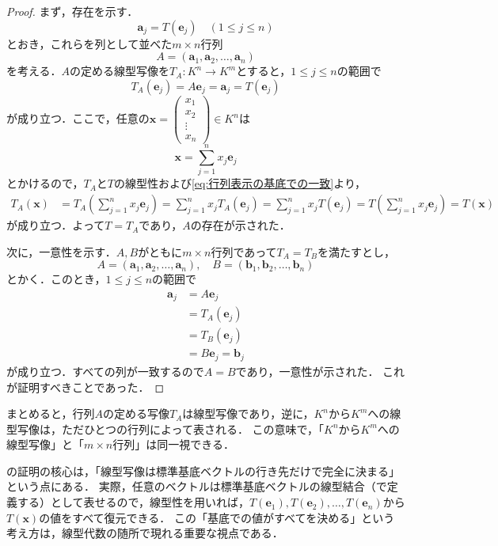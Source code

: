 \begin{tleftbar}
\begin{proof}
  まず，存在を示す．
  \[
    \bm{a}_j = T(\bm{e}_j) \quad (1 \le j \le n)
  \]
  とおき，これらを列として並べた$m \times n$行列
  \[
    A = (\bm{a}_1, \bm{a}_2, \dots, \bm{a}_n)
  \]
  を考える．$A$の定める線型写像を$T_A \colon K^n \to K^m$とすると，$1 \le j \le n$の範囲で
  \begin{equation}
    T_A(\bm{e}_j) = A\bm{e}_j = \bm{a}_j = T(\bm{e}_j) \label{eq:行列表示の基底での一致}
  \end{equation}
  が成り立つ．ここで，任意の$\bm{x} = \begin{pmatrix} x_1 \\ x_2 \\ \vdots \\ x_n \end{pmatrix} \in K^n$は
  \[
    \bm{x} = \sum_{j=1}^{n} x_j \bm{e}_j
  \]
  とかけるので，$T_A$と$T$の線型性および\eqref{eq:行列表示の基底での一致}より，
  \begin{align*}
    T_A(\bm{x}) &= T_A\left(\sum_{j=1}^{n} x_j \bm{e}_j\right)
    = \sum_{j=1}^{n} x_j T_A(\bm{e}_j)
    = \sum_{j=1}^{n} x_j T(\bm{e}_j)
    = T\left(\sum_{j=1}^{n} x_j \bm{e}_j\right)
    = T(\bm{x})
  \end{align*}
  が成り立つ．よって$T = T_A$であり，$A$の存在が示された．

  次に，一意性を示す．$A,B$がともに$m \times n$行列であって$T_A = T_B$を満たすとし，
  \[
    A = (\bm{a}_1, \bm{a}_2, \dots, \bm{a}_n), \quad
    B = (\bm{b}_1, \bm{b}_2, \dots, \bm{b}_n)
  \]
  とかく．このとき，$1 \le j \le n$の範囲で
  \begin{align}
    \bm{a}_j &= A\bm{e}_j \nonumber \\
    &= T_A(\bm{e}_j) \tag{$T_A$の定義} \\
    &= T_B(\bm{e}_j) \tag{$T_A = T_B$} \\
    &= B\bm{e}_j = \bm{b}_j \nonumber
  \end{align}
  が成り立つ．すべての列が一致するので$A = B$であり，一意性が示された．
  これが証明すべきことであった．
\end{proof}
\end{tleftbar}

まとめると，行列$A$の定める写像$T_A$は線型写像であり，逆に，$K^n$から$K^m$への線型写像は，ただひとつの行列によって表される．
この意味で，「$K^n$から$K^m$への線型写像」と「$m \times n$行列」は同一視できる．

\begin{remark}[線型写像は基底ベクトルの行き先で決まる]
  の証明の核心は，「線型写像は標準基底ベクトルの行き先だけで完全に決まる」という点にある．
  実際，任意のベクトルは標準基底ベクトルの線型結合（で定義する）として表せるので，線型性を用いれば，$T(\bm{e}_1), T(\bm{e}_2), \dots, T(\bm{e}_n)$から$T(\bm{x})$の値をすべて復元できる．
  この「基底での値がすべてを決める」という考え方は，線型代数の随所で現れる重要な視点である．
\end{remark}

